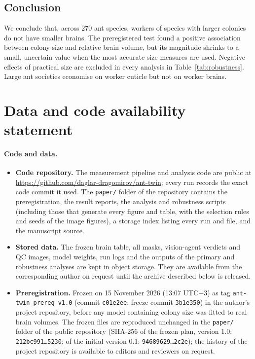 \documentclass[11pt]{article}
\begin{document}
\subsection{Conclusion}\label{sec:conclusion}

We conclude that, across $270$ ant species, workers of species with larger colonies do not have smaller brains. The
preregistered test found a positive association between colony size and relative brain volume, but its magnitude
shrinks to a small, uncertain value when the most accurate size measures are used. Negative effects of practical size
are excluded in every analysis in Table~\ref{tab:robustness}. Large ant societies economise on worker cuticle but not
on worker brains.

\section*{Data and code availability statement}\label{sec:data}

\paragraph{Code and data.}
\begin{itemize}
\item \textbf{Code repository.} The measurement pipeline and analysis code are public at
\url{https://github.com/daglar-dragomirov/ant-twin}; every run records the exact code commit it used. The
\texttt{paper/} folder of the repository contains the preregistration, the result reports, the analysis and robustness
scripts (including those that generate every figure and table, with the selection rules and seeds of the image
figures), a storage index listing every run and file, and the manuscript source.
\item \textbf{Stored data.} The frozen brain table, all masks, vision-agent verdicts and QC images, model weights, run
logs and the outputs of the primary and robustness analyses are kept in object storage. They are available from the
corresponding author on request until the archive described below is released.
\item \textbf{Preregistration.} Frozen on 15 November 2026 (13:07 UTC+3) as tag \texttt{ant-twin-prereg-v1.0}
(commit \texttt{c01e2ee}; freeze commit \texttt{3b1e350}) in the author's project repository, before any model containing
colony size was fitted to real brain volumes. The frozen files are reproduced unchanged in the \texttt{paper/} folder of
the public repository (SHA-256 of the frozen plan, version 1.0: \texttt{212bc991\ldots{}5230}; of the initial version
0.1: \texttt{94689629\ldots{}2c2e}); the history of the project repository is available to editors and reviewers on
request.
\end{itemize}
\end{document}
